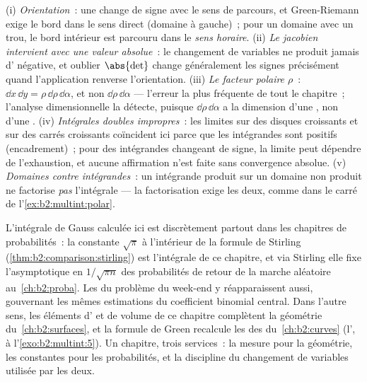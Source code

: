 \begin{remark}
(i) \emph{Orientation}~: une  change de signe avec
le sens de parcours, et Green-Riemann exige le bord dans le sens
direct (domaine à gauche)~; pour un domaine avec un trou, le bord
intérieur est parcouru dans le \emph{sens horaire}. (ii)
\emph{Le jacobien intervient avec une valeur absolue}~: le changement
de variables ne produit jamais d' négative, et oublier
$\abs{\det}$ change généralement les signes précisément quand
l'application renverse l'orientation. (iii) \emph{Le facteur polaire
$\rho$}~: $\dd x\,\dd y = \rho\,\dd\rho\,\dd\alpha$, et non
$\dd\rho\,\dd\alpha$ --- l'erreur la plus fréquente de tout le
chapitre~; l'analyse dimensionnelle la détecte, puisque
$\dd\rho\,\dd\alpha$ a la dimension d'une , non d'une
. (iv) \emph{Intégrales doubles impropres}~: les limites sur des
disques croissants et sur des carrés croissants coïncident ici parce
que les intégrandes sont positifs (encadrement)~; pour des intégrandes
changeant de signe, la limite peut dépendre de l'exhaustion, et aucune
affirmation n'est faite sans convergence absolue. (v)
\emph{Domaines contre intégrandes}~: un intégrande produit sur un
domaine non produit ne factorise \emph{pas} l'intégrale ---
la factorisation exige les deux, comme dans le carré de
l'\cref{ex:b2:multint:polar}.
\end{remark}

\begin{remark}
L'intégrale de Gauss calculée ici est discrètement partout dans
les chapitres de probabilités~: la constante $\sqrt\pi$ à l'intérieur
de la formule de Stirling (\cref{thm:b2:comparison:stirling}) est
l'intégrale de ce chapitre, et via Stirling elle fixe l'asymptotique
en $1/\sqrt{\pi n}$ des probabilités de retour de la marche
aléatoire au~\cref{ch:b2:proba}. Les  du
problème du week-end y réapparaissent aussi, gouvernant les mêmes
estimations du coefficient binomial central. Dans l'autre sens, les
éléments d' et de volume de ce chapitre complètent la géométrie
du~\cref{ch:b2:surfaces}, et la formule de Green recalcule les
 des  du~\cref{ch:b2:curves} (l', à
l'\cref{exo:b2:multint:5}). Un chapitre, trois services~:
la mesure pour la géométrie, les constantes pour les probabilités, et
la discipline du changement de variables utilisée par les deux.
\end{remark}

